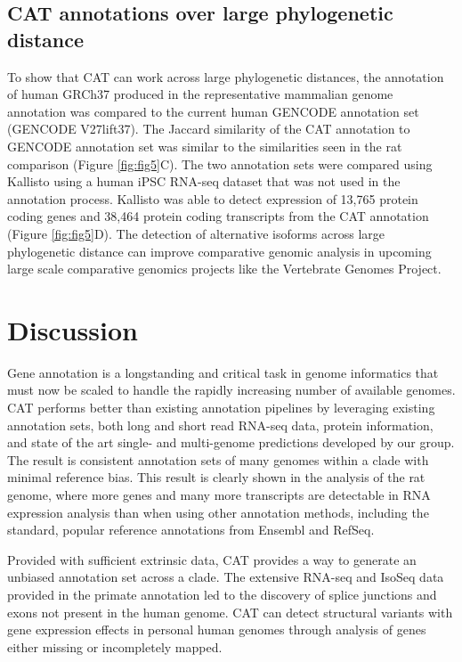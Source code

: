 \documentclass[fleqn,10pt]{wlscirep}
\begin{document}
\subsection*{CAT annotations over large phylogenetic distance}

To show that CAT can work across large phylogenetic distances, the annotation of human GRCh37 produced in the representative mammalian genome annotation was compared to the current human GENCODE annotation set (GENCODE V27lift37). The Jaccard similarity of the CAT annotation to GENCODE annotation set was similar to the similarities seen in the rat comparison (Figure \ref{fig:fig5}C). The two annotation sets were compared using Kallisto using a human iPSC RNA-seq dataset that was not used in the annotation process. Kallisto was able to detect expression of 13,765 protein coding genes and 38,464 protein coding transcripts from the CAT annotation (Figure \ref{fig:fig5}D). The detection of alternative isoforms across large phylogenetic distance can improve comparative genomic analysis in upcoming large scale comparative genomics projects like the Vertebrate Genomes Project.

\section{Discussion}
Gene annotation is a longstanding and critical task in genome informatics that must now be scaled to handle the rapidly increasing number of available genomes. CAT performs better than existing annotation pipelines by leveraging existing annotation sets, both long and short read RNA-seq data, protein information, and state of the art single- and multi-genome predictions developed by our group. The result is consistent annotation sets of many genomes within a clade with minimal reference bias. This result is clearly shown in the analysis of the rat genome, where more genes and many more transcripts are detectable in RNA expression analysis than when using other annotation methods, including the standard, popular reference annotations from Ensembl and RefSeq.

Provided with sufficient extrinsic data, CAT provides a way to generate an unbiased annotation set across a clade. The extensive RNA-seq and IsoSeq data provided in the primate annotation led to the discovery of splice junctions and exons not present in the human genome. CAT can detect structural variants with gene expression effects in personal human genomes through analysis of genes either missing or incompletely mapped.
\end{document}
